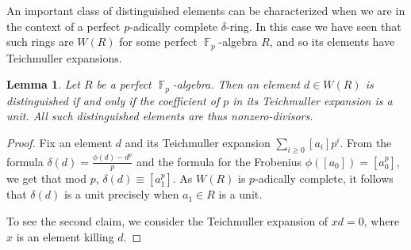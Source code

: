 \documentclass[12pt]{amsproc}
\newtheorem{lemma}{Lemma}
\theoremstyle{definition}
\DeclareMathOperator{\F}{\mathbb{F}}
\begin{document}
An important class of distinguished elements can be characterized when we are in the context of a perfect $p$-adically complete $\delta$-ring. In this case we have seen that such rings are $W(R)$ for some perfect $\F_p$-algebra $R$, and so its elements have Teichmuller expansions.

\begin{lemma} Let $R$ be a perfect $\F_p$-algebra. Then an element $d\in W(R)$ is distinguished if and only if the coefficient of $p$ in its Teichmuller expansion is a unit. All such distinguished elements are thus nonzero-divisors.
\end{lemma}
\begin{proof}
Fix an element $d$ and its Teichmuller expansion $\sum_{i\ge 0} [a_i]p^i$. From the formula $\delta(d)=\frac{\phi(d)-d^p}{p}$ and the formula for the Frobenius $\phi([a_0])=[a_0^p]$, we get that mod $p$, $\delta(d)\equiv [a_1^p]$. As $W(R)$ is $p$-adically complete, it follows that $\delta(d)$ is a unit precisely when $a_1\in R$ is a unit.

To see the second claim, we consider the Teichmuller expansion of $xd=0$, where $x$ is an element killing $d$.
\end{proof}
\end{document}
